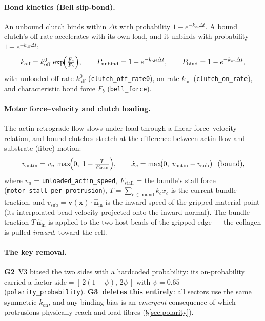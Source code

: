 \documentclass[11pt]{article}
\newcommand{\dt}{\Delta t}
\newcommand{\GTwo}{\textcolor{g2col}{\textbf{G2}}}
\newcommand{\GThree}{\textcolor{g3col}{\textbf{G3}}}
\newcommand{\code}[1]{\texttt{\small #1}}
\begin{document}
\paragraph{Bond kinetics (Bell slip-bond).}
An unbound clutch binds within $\dt$ with probability $1-e^{-k_{\text{on}}\dt}$. A bound clutch's
off-rate accelerates with its own load, and it unbinds with probability
$1-e^{-k_{\text{off}}\dt}$:
\begin{equation}
  k_{\text{off}} = k_{\text{off}}^{0}\,\exp\!\Bigl(\tfrac{F_c}{F_b}\Bigr),
  \qquad
  P_{\text{unbind}} = 1-e^{-k_{\text{off}}\dt},
  \qquad
  P_{\text{bind}} = 1-e^{-k_{\text{on}}\dt},
  \label{eq:bell}
\end{equation}
with unloaded off-rate $k_{\text{off}}^0$ (\code{clutch\_off\_rate0}), on-rate $k_{\text{on}}$
(\code{clutch\_on\_rate}), and characteristic bond force $F_b$ (\code{bell\_force}).

\paragraph{Motor force--velocity and clutch loading.}
The actin retrograde flow slows under load through a linear force--velocity relation, and bound
clutches stretch at the difference between actin flow and substrate (fibre) motion:
\begin{equation}
  v_{\text{actin}} = v_u\,\max\!\Bigl(0,\; 1-\tfrac{T}{F_{\text{stall}}}\Bigr),
  \qquad
  \dot x_c = \max\!\bigl(0,\; v_{\text{actin}} - v_{\text{sub}}\bigr)\ \ (\text{bound}),
  \label{eq:motor}
\end{equation}
where $v_u$ = \code{unloaded\_actin\_speed}, $F_{\text{stall}}$ = the bundle's stall force
(\code{motor\_stall\_per\_protrusion}), $T=\sum_{c\in\text{bound}}k_c x_c$ is the current bundle
traction, and $v_{\text{sub}}=\mathbf v(\mathbf x)\!\cdot\!\hat{\mathbf n}_{\text{in}}$ is the
inward speed of the gripped material point (its interpolated bead velocity projected onto the
inward normal). The bundle traction $T\,\hat{\mathbf n}_{\text{in}}$ is applied to the two host
beads of the gripped edge --- the collagen is pulled \emph{inward}, toward the cell.

\paragraph{The key removal.} \GTwo\ V3 biased the two sides with a hardcoded probability: its
on-probability carried a factor $\text{side} = [\,2(1-\psi),\,2\psi\,]$ with $\psi = 0.65$
(\code{polarity\_probability}). \textbf{\GThree\ deletes this entirely}: all sectors use the same
symmetric $k_{\text{on}}$, and any binding bias is an \emph{emergent} consequence of which
protrusions physically reach and load fibres (\S\ref{sec:polarity}).
\end{document}

